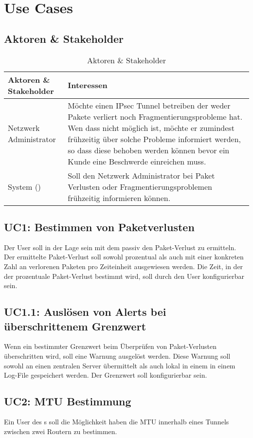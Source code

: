 \section{Use Cases}
\label{sec:Use Cases}

\subsection{Aktoren \& Stakeholder}

\begin{table}[H]
\begin{tabularx}{\textwidth}{l|>{\raggedright\arraybackslash}X} 
\textbf{Aktoren \& Stakeholder} & \textbf{Interessen}\\
\hline
Netzwerk Administrator & Möchte einen \ac{IPsec} Tunnel betreiben der weder Pakete verliert noch Fragmentierungsprobleme hat. Wen dass nicht möglich ist, möchte er zumindest frühzeitig über solche Probleme informiert werden, so dass diese behoben werden können bevor ein Kunde eine Beschwerde einreichen muss.\\
System (\tool{}) & Soll den Netzwerk Administrator bei Paket Verlusten oder Fragmentierungsproblemen frühzeitig informieren können. \\
\end{tabularx}
\caption{Aktoren \& Stakeholder}
\end{table}

\subsection{UC1: Bestimmen von Paketverlusten}
Der User soll in der Lage sein mit dem \tool{} passiv den Paket-Verlust zu ermitteln. Der ermittelte Paket-Verlust soll sowohl prozentual als auch mit einer konkreten Zahl an verlorenen Paketen pro Zeiteinheit ausgewiesen werden. Die Zeit, in der der prozentuale Paket-Verlust bestimmt wird, soll durch den User konfigurierbar sein.

\subsection{UC1.1: Auslösen von Alerts bei überschrittenem Grenzwert}
Wenn ein bestimmter Grenzwert beim Überprüfen von Paket-Verlusten überschritten wird, soll eine Warnung ausgelöst werden. Diese Warnung soll sowohl an einen zentralen Server übermittelt als auch lokal in einem in einem Log-File gespeichert werden. Der Grenzwert soll konfigurierbar sein.

\subsection{UC2: MTU Bestimmung}
Ein User des \tool{}s soll die Möglichkeit haben die \ac{MTU} innerhalb eines Tunnels zwischen zwei Routern zu bestimmen.

